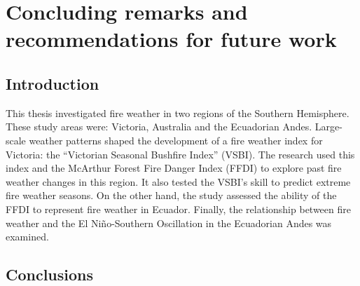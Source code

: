 
\chapter{Concluding remarks and recommendations for future work}
\newpage{}

\section{Introduction}

This thesis investigated fire weather in two regions of the Southern
Hemisphere. These study areas were: Victoria, Australia and the Ecuadorian
Andes. Large-scale weather patterns shaped the development of a fire
weather index for Victoria: the ``Victorian Seasonal Bushfire Index''
(VSBI). The research used this index and the McArthur Forest Fire
Danger Index (FFDI) to explore past fire weather changes in this region.
It also tested the VSBI's skill to predict extreme fire weather seasons.
On the other hand, the study assessed the ability of the FFDI to represent
fire weather in Ecuador. Finally, the relationship between fire weather
and the El Ni\~no-Southern Oscillation in the Ecuadorian Andes was examined.

\section{Conclusions}


